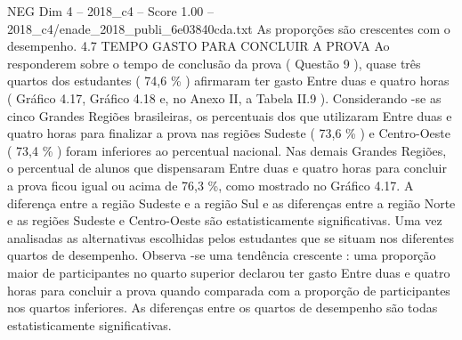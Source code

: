 \begin{textsample}{NEG Dim 4 – 2018\_c4 – Score 1.00 – 2018\_c4/enade\_2018\_publi\_6e03840cda.txt}
As proporções são crescentes com o desempenho. 4.7 TEMPO GASTO PARA CONCLUIR A PROVA Ao responderem sobre o tempo de conclusão da prova ( Questão 9 ), quase três quartos dos estudantes ( 74,6 \% ) afirmaram ter gasto Entre duas e quatro horas ( Gráfico 4.17, Gráfico 4.18 e, no Anexo II, a Tabela II.9 ).
Considerando -se as cinco Grandes Regiões brasileiras, os percentuais dos que utilizaram Entre duas e quatro horas para finalizar a prova nas regiões Sudeste ( 73,6 \% ) e Centro-Oeste ( 73,4 \% ) foram inferiores ao percentual nacional.
Nas demais Grandes Regiões, o percentual de alunos que dispensaram Entre duas e quatro horas para concluir a prova ficou igual ou acima de 76,3 \%, como mostrado no Gráfico 4.17.
A diferença entre a região Sudeste e a região Sul e as diferenças entre a região Norte e as regiões Sudeste e Centro-Oeste são estatisticamente significativas.
Uma vez analisadas as alternativas escolhidas pelos estudantes que se situam nos diferentes quartos de desempenho.
Observa -se uma tendência crescente : uma proporção maior de participantes no quarto superior declarou ter gasto Entre duas e quatro horas para concluir a prova quando comparada com a proporção de participantes nos quartos inferiores.
As diferenças entre os quartos de desempenho são todas estatisticamente significativas.

\end{textsample}
